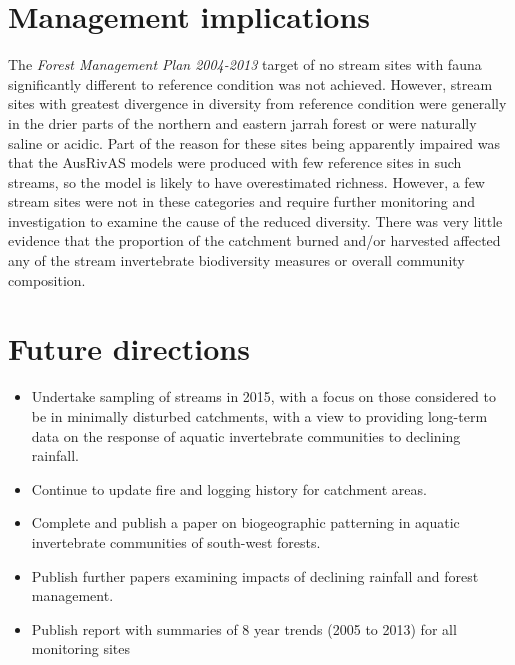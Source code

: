 \documentclass[version=last, paper=a4, DIV=18, usenames, dvipsnames]{scrartcl}
\begin{document}
\section{Management implications}



The \emph{Forest Management Plan 2004-2013} target of no stream sites with fauna significantly different to reference condition was not achieved. However, stream sites with greatest divergence in diversity from reference condition were generally in the drier parts of the northern and eastern jarrah forest or were naturally saline or acidic. Part of the reason for these sites being apparently impaired was that the AusRivAS models were produced with few reference sites in such streams, so the model is likely to have overestimated richness. However, a few stream sites were not in these categories and require further monitoring and investigation to examine the cause of the reduced diversity. There was very little evidence that the proportion of the catchment burned and/or harvested affected any of the stream invertebrate biodiversity measures or overall community composition.






\section{Future directions}



\begin{itemize}

  \item Undertake sampling of streams in 2015, with a focus on those considered to be in minimally disturbed catchments, with a view to providing long-term data on the response of aquatic invertebrate communities to declining rainfall.

  \item Continue to update fire and logging history for catchment areas.

  \item Complete and publish a paper on biogeographic patterning in aquatic invertebrate communities of south-west forests.

  \item Publish further papers examining impacts of declining rainfall and forest management.

  \item Publish report with summaries of 8 year trends (2005 to 2013) for all monitoring sites

\end{itemize}






\clearpage
\end{document}

